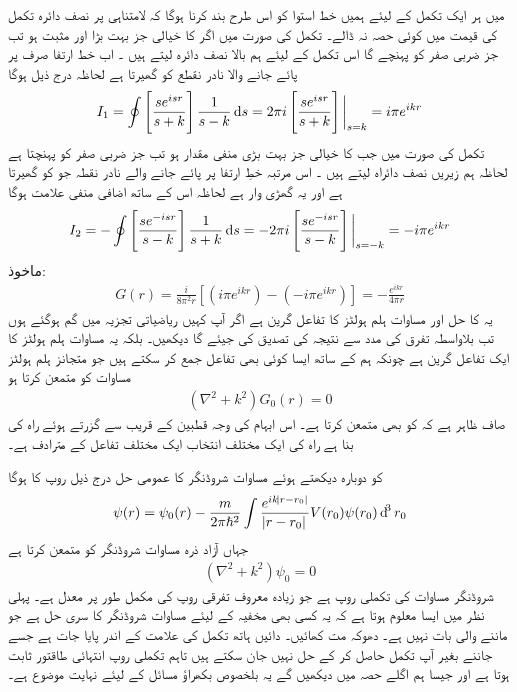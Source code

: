  میں ہر ایک تکمل کے لیئے ہمیں خط استوا کو اس طرح بند کرنا ہوگا  کہ لامتناہی پر نصف دائرہ تکمل کی قیمت میں کوئی حصہ نہ ڈالے۔ تکمل  کی صورت میں اگر  کا خیالی جز بہت بڑا اور مثبت ہو تب جز ضربی  صفر کو پہنچے گا اس تکمل کے لیئے ہم بالا نصف دائرہ لیتے ہیں ۔ اب خط ارتفا صرف  پر پائے جانے والا نادر نقطع کو گھیرتا ہے لحاظہ درج ذیل ہوگا
\begin{align}
	I_1 = \oint\left[\frac{se^{isr}}{s+k}\right]\frac{1}{s-k}\dif s = 2\pi i\left[\frac{se^{isr}}{s+k}\right]\bigg|_{s=k} = i\pi e^{ikr}
\end{align}
تکمل  کی صورت میں جب  کا خیالی جز بہت بڑی منفی مقدار ہو تب جز ضربی  صفر کو پہنچتا ہے لحاظہ ہم زیریں نصف دائراہ لیتے ہیں ۔ اس مرتبہ خطِ ارتفا  پر پائے جانے والے نادر نقطہ جو کو گھیرتا ہے اور یہ گھڑی وار ہے لحاظہ اس کے ساتھ اضافی منفی علامت ہوگا
\begin{align}
	I_2 = -\oint\left[\frac{se^{-isr}}{s-k}\right]\frac{1}{s+k}\dif s = -2\pi i\left[\frac{se^{-isr}}{s-k}\right]\bigg|_{s=-k} = -i\pi e^{ikr}
\end{align}
ماخوذ:
\begin{align}
	G(r) = \frac{i}{8\pi^2r}\left[\left(i\pi e^{ikr}\right)-\left(-i\pi e^{ikr}\right)\right] = -\frac{e^{ikr}}{4\pi r}
\end{align}
یہ  کا حل اور مساوات ہلم ہولٹز کا تفاعل گرین ہے اگر آپ کہیں ریاضیاتی تجزیہ میں گم ہوگئے ہوں تب بلاواسطہ تفرق کی مدد سے نتیجہ کی تصدیق کی جیئے گا  دیکھیں۔ بلکہ یہ مساوات ہلم ہولٹز کا ایک تفاعل گرین ہے چونکہ ہم  کے ساتھ ایسا کوئی بھی تفاعل  جمع کر سکتے ہیں جو متجانز ہلم ہولٹز مساوات کو متمعن کرتا ہو
\begin{align}
	(\nabla^2+k^2)G_0(r) = 0
\end{align}
صاف ظاہر ہے کہ  کو  بھی متمعن کرتا ہے۔ اس ابہام کی وجہ قطبین کے قریب سے گزرتے ہوئے راہ کی بنا ہے راہ کی ایک مختلف انتخاب ایک مختلف تفاعل  کے مترادف ہے۔

 کو دوبارہ دیکھتے ہوئے مساوات شروڈنگر کا عمومی حل درج ذیل روپ کا ہوگا
\begin{align}
	\psi(r) = \psi_0(r)-\frac{m}{2\pi\hslash^2}\int\frac{e^{ik\abs{r-r_0}}}{\abs{r-r_0}}V(r_0)\psi(r_0)\dif^3r_0
\end{align}
جہاں  آزاد ذرہ مساوات شروڈنگر کو متمعن کرتا ہے
\begin{align}
	(\nabla^2+k^2)\psi_0 = 0
\end{align}
 شروڈنگر مساوات کی تکملی روپ ہے جو زیادہ معروف تفرقی روپ کی مکمل طور پر معدل ہے۔ پہلی نظر میں ایسا معلوم ہوتا ہے کہ یہ کسی بھی مخفیہ کے لیئے مساوات شروڈنگر کا سری حل ہے جو ماننے والی بات نہیں ہے۔ دھوکہ مت کھائیں۔ دائیں ہاتھ تکمل کی علامت کے اندر  پایا جات ہے جسے جاننے بغیر آپ تکمل حاصل کر کے حل نہیں جان سکتے ہیں  تاہم تکملی روپ انتہائی طاقتور ثابت ہوتا ہے اور جیسا ہم اگلے حصہ میں دیکھیں گے یہ بلخصوص بکھراؤ مسائل کے لیئے نہایت موضوع ہے۔


